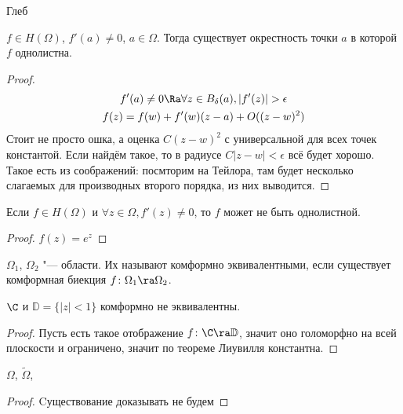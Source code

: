\TODO Глеб

\begin{Rem}
	$f \in H(\Omega)$, $f'(a) \ne 0$, $a \in \Omega$.
	Тогда существует окрестность точки $a$ в которой $f$ однолистна.
\end{Rem}

\begin{proof}
	\begin{gather*}
		f'(a) \ne 0 \Ra \forall z \in B_{\delta}(a), |f'(z)| > \epsilon \\
		f(z) = f(w) + f'(w) (z-a) + O((z-w)^2)
	\end{gather*}
	Стоит не просто ошка, а оценка $C(z-w)^2$ с универсальной для всех точек константой.
	Если найдём такое, то в радиусе $C|z-w| < \epsilon$ всё будет хорошо.
	Такое есть из соображений: посмторим на Тейлора, там будет несколько слагаемых для производных второго порядка, из них выводится.
\end{proof}

\begin{Rem}
	Если $f \in H(\Omega)$ и $\forall z \in \Omega, f'(z) \ne 0$, то $f$ может не быть однолистной.
\end{Rem}

\begin{proof}
	$f(z) = e^z$
\end{proof}

\begin{Def}
	$\Omega_1$, $\Omega_2$ "--- области.
	Их называют комформно эквивалентными, если существует комформная биекция $f\colon \Omega_1 \ra \Omega_2$.
\end{Def}

\begin{theorem}
	$\C$ и $\mathbb D = \{|z| < 1 \}$ комформно не эквивалентны.
\end{theorem}

\begin{proof}
	Пусть есть такое отображение $f\colon \C \ra \mathbb D$, значит оно голоморфно на всей плоскости и ограничено, значит по теореме Лиувилля константна.
\end{proof}

\begin{theorem}
	$\Omega$, $\tilde \Omega$, \TODO
\end{theorem}

\begin{proof}
	Cуществование доказывать не будем 
\end{proof}

